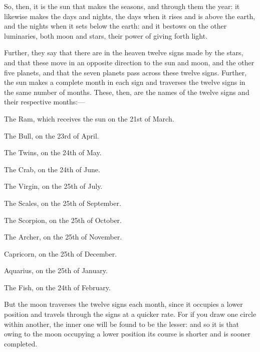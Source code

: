 So, then, it is the sun that makes the seasons, and through them the year: it likewise makes the days and nights, the days when it rises and is above the earth, and the nights when it sets below the earth: and it bestows on the other luminaries, both moon and stars, their power of giving forth light.

Further, they say that there are in the heaven twelve signs made by the stars, and that these move in an opposite direction to the sun and moon, and the other five planets, and that the seven planets pass across these twelve signs. Further, the sun makes a complete month in each sign and traverses the twelve signs in the same number of months. These, then, are the names of the twelve signs and their respective months:—

The Ram, which receives the sun on the 21st of March.

The Bull, on the 23rd of April.

The Twins, on the 24th of May.

The Crab, on the 24th of June.

The Virgin, on the 25th of July.

The Scales, on the 25th of September.

The Scorpion, on the 25th of October.

The Archer, on the 25th of November.

Capricorn, on the 25th of December.

Aquarius, on the 25th of January.

The Fish, on the 24th of February.

But the moon traverses the twelve signs each month, since it occupies a lower position and travels through the signs at a quicker rate. For if you draw one circle within another, the inner one will be found to be the lesser: and so it is that owing to the moon occupying a lower position its course is shorter and is sooner completed.

